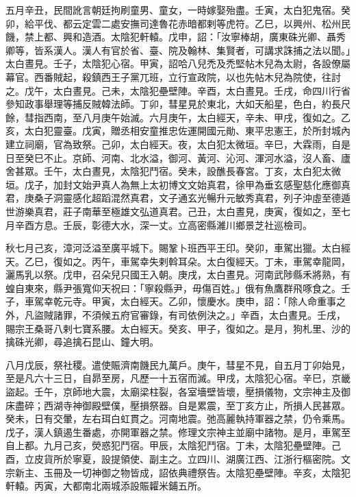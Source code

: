 \begin{pinyinscope}
 五月辛丑，民間訛言朝廷拘刷童男、童女，一時嫁娶殆盡。壬寅，太白犯鬼宿。癸卯，給平伐、都云定雲二處安撫司達魯花赤暗都剌等虎符。乙巳，以興州、松州民饑，禁上都、興和造酒。太陰犯軒轅。戊申，詔：「汝寧棒胡，廣東硃光卿、聶秀卿等，皆系漢人。漢人有官於省、臺、院及翰林、集賢者，可講求誅捕之法以聞。」太白晝見。壬子，太陰犯心宿。甲寅，詔哈八兒禿及禿堅帖木兒為太尉，各設僚屬幕官。西番賊起，殺鎮西王子黨兀班，立行宣政院，以也先帖木兒為院使，往討之。戊午，太白晝見。己未，太陰犯壘壁陣。辛酉，太白晝見。壬戌，命四川行省參知政事舉理等捕反賊韓法師。丁卯，彗星見於東北，大如天船星，色白，約長尺餘，彗指西南，至八月庚午始滅。六月庚午，太白經天，辛未、甲戌，復如之。乙亥，太白犯靈臺。戊寅，贈丞相安童推忠佐運開國元勛、東平忠憲王，於所封城內建立祠廟，官為致祭。己卯，太白經天。夜，太白犯太微垣。辛巳，大霖雨，自是日至癸巳不止。京師、河南、北水溢，御河、黃河、沁河、渾河水溢，沒人畜、廬舍甚眾。壬午，太白晝見，太陰犯鬥宿。癸未，設醮長春宮。丁亥，太白犯太微垣。戊子，加封文始尹真人為無上太初博文文始真君，徐甲為垂玄感聖慈化應御真君，庚桑子洞靈感化超蹈混然真君，文子通玄光暢升元敏秀真君，列子沖虛至德遁世游樂真君，莊子南華至極雄文弘道真君。己丑，太白晝見，庚寅，復如之，至七月辛酉方息。壬辰，彰德大水，深一丈。立高密縣濰川鄉景芝社巡檢司。



 秋七月己亥，漳河泛溢至廣平城下。賜鞏卜班西平王印。癸卯，車駕出獵。太白經天。乙巳，復如之。丙午，車駕幸失剌斡耳朵。太白復經天。丁未，車駕幸龍岡，灑馬乳以祭。戊申，召朵兒只國王入朝。庚戌，太白晝見。河南武陟縣禾將熟，有蝗自東來，縣尹張寬仰天祝曰：「寧殺縣尹，毋傷百姓。」俄有魚鷹群飛啄食之。壬子，車駕幸乾元寺。甲寅，太白經天。乙卯，懷慶水。庚申，詔：「除人命重事之外，凡盜賊諸罪，不須候五府官審錄，有司依例決之。」辛酉，太白晝見。壬戌，賜宗王桑哥八剌七寶系腰。太白經天。癸亥、甲子，復如之。是月，狗札里、沙的擒硃光卿，尋追擒石昆山、鐘大明。



 八月戊辰，祭社稷。遣使賑濟南饑民九萬戶。庚午，彗星不見，自五月丁卯始見，至是凡六十三日，自昴至房，凡歷一十五宿而滅。甲戌，太陰犯心宿。辛巳，京畿盜起。壬午，京師地大震，太廟梁柱裂，各室墻壁皆壞，壓損儀物，文宗神主及御床盡碎；西湖寺神御殿壁僕，壓損祭器。自是累震，至丁亥方止，所損人民甚眾。癸未，日有交暈，左右珥白虹貫之。河南地震。弛高麗執持軍器之禁，仍令乘馬。戊子，漢人鎮遏生番處，亦開軍器之禁。修理文宗神主並廟中諸物。是月，車駕至自上都。九月己亥，熒惑犯鬥宿。甲辰，太陰犯鬥宿。丁未，太陰犯壘壁陣。己酉，立皮貨所於寧夏，設提領使、副主之。立四川、湖廣江西、江浙行樞密院。文宗新主、玉冊及一切神御之物皆成，詔依典禮祭告。太陰犯壘壁陣。辛亥，太陰犯軒轅。丙寅，大都南北兩城添設賑糶米鋪五所。




\end{pinyinscope}

